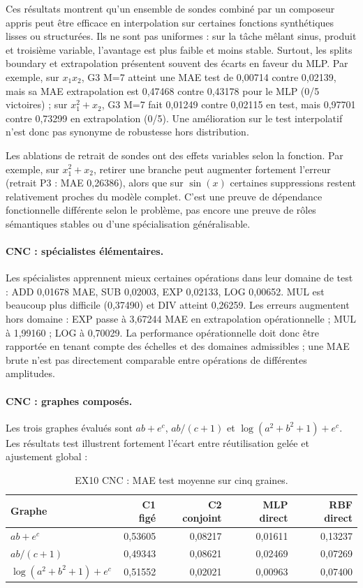\documentclass[11pt,a4paper]{article}
\begin{document}
Ces résultats montrent qu'un ensemble de sondes combiné par un composeur appris peut être efficace en interpolation sur certaines fonctions synthétiques lisses ou structurées. Ils ne sont pas uniformes : sur la tâche mêlant sinus, produit et troisième variable, l'avantage est plus faible et moins stable. Surtout, les splits boundary et extrapolation présentent souvent des écarts en faveur du MLP. Par exemple, sur \(x_1x_2\), G3 M=7 atteint une MAE test de 0,00714 contre 0,02139, mais sa MAE extrapolation est 0,47468 contre 0,43178 pour le MLP (0/5 victoires) ; sur \(x_1^2+x_2\), G3 M=7 fait 0,01249 contre 0,02115 en test, mais 0,97701 contre 0,73299 en extrapolation (0/5). Une amélioration sur le test interpolatif n'est donc pas synonyme de robustesse hors distribution.

Les ablations de retrait de sondes ont des effets variables selon la fonction. Par exemple, sur \(x_1^2+x_2\), retirer une branche peut augmenter fortement l'erreur (retrait P3 : MAE 0,26386), alors que sur \(\sin(x)\) certaines suppressions restent relativement proches du modèle complet. C'est une preuve de dépendance fonctionnelle différente selon le problème, pas encore une preuve de rôles sémantiques stables ou d'une spécialisation généralisable.

\paragraph{CNC : spécialistes élémentaires.} Les spécialistes apprennent mieux certaines opérations dans leur domaine de test : ADD 0,01678 MAE, SUB 0,02003, EXP 0,02133, LOG 0,00652. MUL est beaucoup plus difficile (0,37490) et DIV atteint 0,26259. Les erreurs augmentent hors domaine : EXP passe à 3,67244 MAE en extrapolation opérationnelle ; MUL à 1,99160 ; LOG à 0,70029. La performance opérationnelle doit donc être rapportée en tenant compte des échelles et des domaines admissibles ; une MAE brute n'est pas directement comparable entre opérations de différentes amplitudes.

\paragraph{CNC : graphes composés.} Les trois graphes évalués sont \(ab+e^c\), \(ab/(c+1)\) et \(\log(a^2+b^2+1)+e^c\). Les résultats test illustrent fortement l'écart entre réutilisation gelée et ajustement global :
\begin{table}[H]
\centering\small
\caption{EX10 CNC : MAE test moyenne sur cinq graines.}
\begin{tabularx}{\textwidth}{lrrrr}
\toprule
Graphe & C1 figé & C2 conjoint & MLP direct & RBF direct\\
\midrule
\(ab+e^c\) & 0,53605 & 0,08217 & 0,01611 & 0,13237\\
\(ab/(c+1)\) & 0,49343 & 0,08621 & 0,02469 & 0,07269\\
\(\log(a^2+b^2+1)+e^c\) & 0,51552 & 0,02021 & 0,00963 & 0,07400\\
\bottomrule
\end{tabularx}
\end{table}
\end{document}
